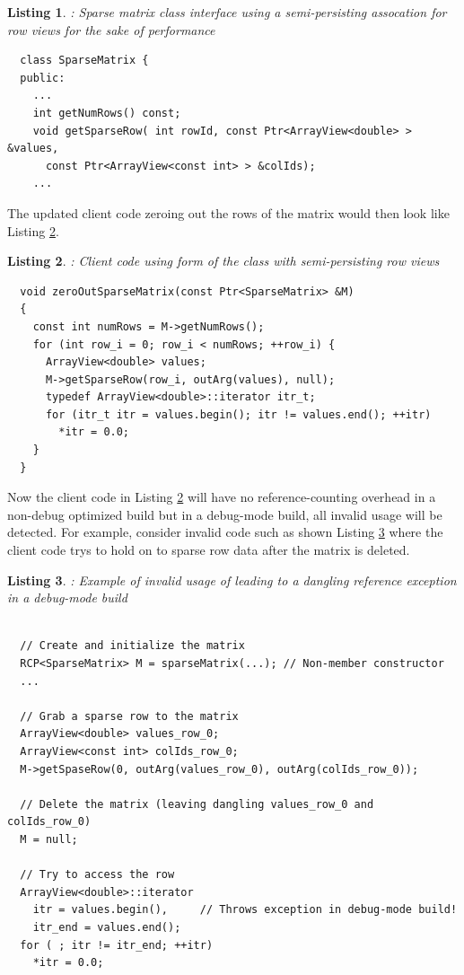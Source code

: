 \documentclass[pdf,ps2pdf,11pt]{SANDreport}
\newtheorem{listing}{Listing}
\begin{document}
\begin{listing}: Sparse matrix class interface using a semi-persisting
assocation for row views for the sake of performance \\
\label{listing:SparseMatrix-ArrayView}
{\small\begin{verbatim}
  class SparseMatrix {
  public:
    ...
    int getNumRows() const;
    void getSparseRow( int rowId, const Ptr<ArrayView<double> > &values,
      const Ptr<ArrayView<const int> > &colIds);
    ...
\end{verbatim}}
\end{listing}


The updated client code zeroing out the rows of the matrix would then
look like Listing {}\ref{listing:zeroOutSparseMatrix-ArrayView}.


\begin{listing}: Client code using {} form of the
{} class with semi-persisting row views  \\
\label{listing:zeroOutSparseMatrix-ArrayView}
{\small\begin{verbatim}
  void zeroOutSparseMatrix(const Ptr<SparseMatrix> &M)
  {
    const int numRows = M->getNumRows();
    for (int row_i = 0; row_i < numRows; ++row_i) {
      ArrayView<double> values;
      M->getSparseRow(row_i, outArg(values), null);
      typedef ArrayView<double>::iterator itr_t;
      for (itr_t itr = values.begin(); itr != values.end(); ++itr)
        *itr = 0.0;
    }
  }
\end{verbatim}}
\end{listing}


Now the client code in Listing
{}\ref{listing:zeroOutSparseMatrix-ArrayView} will have no
reference-counting overhead in a non-debug optimized build but in a
debug-mode build, all invalid usage will be detected.  For example,
consider invalid code such as shown Listing
{}\ref{listing:SparseMatrix-dangling-ref} where the client code trys
to hold on to sparse row data after the matrix is deleted.


\begin{listing}: Example of invalid usage of {} leading
to a dangling reference exception in a debug-mode build  \\
\label{listing:SparseMatrix-dangling-ref}
{\small\begin{verbatim}

  // Create and initialize the matrix
  RCP<SparseMatrix> M = sparseMatrix(...); // Non-member constructor
  ...

  // Grab a sparse row to the matrix
  ArrayView<double> values_row_0;
  ArrayView<const int> colIds_row_0;
  M->getSpaseRow(0, outArg(values_row_0), outArg(colIds_row_0));

  // Delete the matrix (leaving dangling values_row_0 and colIds_row_0)
  M = null;

  // Try to access the row
  ArrayView<double>::iterator
    itr = values.begin(),     // Throws exception in debug-mode build!
    itr_end = values.end();
  for ( ; itr != itr_end; ++itr)
    *itr = 0.0; 
\end{verbatim}}
\end{listing}
\end{document}
